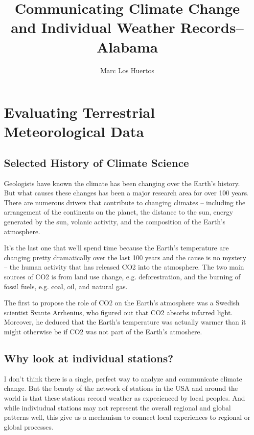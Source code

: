 \documentclass{article}\usepackage[]{graphicx}\usepackage[]{color}
\title{Communicating Climate Change and Individual Weather Records--Alabama}
\author{Marc Los Huertos}
\begin{document}
\maketitle

\section{Evaluating Terrestrial Meteorological Data}

\subsection{Selected History of Climate Science}

Geologists have known the climate has been changing over the Earth's history. But what causes these changes has been a major research area for over 100 years. There are numerous drivers that contribute to changing climates -- including the arrangement of the continents on the planet, the distance to the sun, energy generated by the sun, volanic activity, and the composition of the Earth's atmosphere. 

It's the last one that we'll spend time because the Earth's temperature are changing pretty dramatically over the last 100 years and the cause is no mystery -- the human activity that has released CO2 into the atmosphere. The two main sources of CO2 is from land use change, e.g. deforestration, and the burning of fossil fuels, e.g. coal, oil, and natural gas. 

The first to propose the role of CO2 on the Earth's atmosphere was a Swedish scientist Svante Arrhenius, who figured out that CO2 absorbs infarred light. Moreover, he deduced that the Earth's temperature was actually warmer than it might otherwise be if CO2 was not part of the Earth's atmoshere. 

\subsection{Why look at individual stations?}

I don't think there is a single, perfect way to analyze and communicate climate change. But the beauty of the network of stations in the USA and around the world is that these stations record weather as expecienced by local peoples. And while indiviudual stations may not represent the overall regional and global patterns well, this give us a mechanism to connect local experiences to regional or global processes. 
\end{document}
